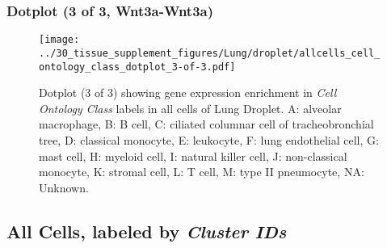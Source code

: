 \clearpage

\subsubsection{Dotplot (3 of 3, Wnt3a-Wnt3a)}
\begin{figure}[h]
\centering
\texttt{[image: ../30\_tissue\_supplement\_figures/Lung/droplet/allcells\_cell\_ontology\_class\_dotplot\_3-of-3.pdf]}

\caption{ Dotplot (3 of 3)  showing gene expression enrichment in \emph{Cell Ontology Class} labels in all cells of Lung Droplet. A: alveolar macrophage, B: B cell, C: ciliated columnar cell of tracheobronchial tree, D: classical monocyte, E: leukocyte, F: lung endothelial cell, G: mast cell, H: myeloid cell, I: natural killer cell, J: non-classical monocyte, K: stromal cell, L: T cell, M: type II pneumocyte, NA: Unknown.}
\end{figure}


\clearpage

\subsection{All Cells, labeled by \emph{Cluster IDs}}
